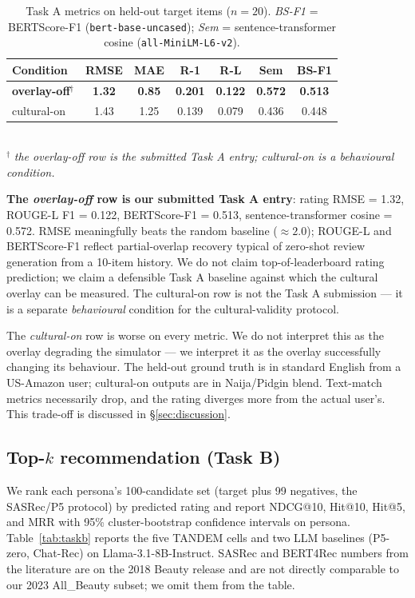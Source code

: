 \documentclass[8pt,twocolumn,a4paper]{extarticle}
\begin{document}
\begin{table}[h]
\centering
\footnotesize
\setlength{\tabcolsep}{4pt}
\caption{Task A metrics on held-out target items ($n=20$). \emph{BS-F1} = BERTScore-F1 (\texttt{bert-base-uncased}); \emph{Sem} = sentence-transformer cosine (\texttt{all-MiniLM-L6-v2}).}
\label{tab:taska}
\setlength{\tabcolsep}{3pt}
\begin{tabular}{lcccccc}
\toprule
Condition           & RMSE  & MAE   & R-1   & R-L   & Sem   & BS-F1 \\
\midrule
\textbf{overlay-off}$^\dagger$ & \textbf{1.32}  & \textbf{0.85}  & \textbf{0.201} & \textbf{0.122} & \textbf{0.572} & \textbf{0.513} \\
cultural-on                    & 1.43  & 1.25  & 0.139 & 0.079 & 0.436 & 0.448 \\
\bottomrule
\end{tabular}\\
{\scriptsize $^\dagger$ \emph{the overlay-off row is the submitted Task A entry; cultural-on is a behavioural condition.}}
\end{table}

\textbf{The \emph{overlay-off} row is our submitted Task A entry}: rating RMSE = 1.32, ROUGE-L F1 = 0.122, BERTScore-F1 = 0.513, sentence-transformer cosine = 0.572. RMSE meaningfully beats the random baseline ($\approx 2.0$); ROUGE-L and BERTScore-F1 reflect partial-overlap recovery typical of zero-shot review generation from a 10-item history. We do not claim top-of-leaderboard rating prediction; we claim a defensible Task A baseline against which the cultural overlay can be measured. The cultural-on row is not the Task A submission --- it is a separate \emph{behavioural} condition for the cultural-validity protocol.

The \emph{cultural-on} row is worse on every metric. We do not interpret this as the overlay degrading the simulator --- we interpret it as the overlay successfully changing its behaviour. The held-out ground truth is in standard English from a US-Amazon user; cultural-on outputs are in Naija/Pidgin blend. Text-match metrics necessarily drop, and the rating diverges more from the actual user's. This trade-off is discussed in \S\ref{sec:discussion}.

\subsection{Top-$k$ recommendation (Task B)}
\label{sec:results:taskb}

We rank each persona's 100-candidate set (target plus 99 negatives, the SASRec/P5 protocol) by predicted rating and report NDCG@10, Hit@10, Hit@5, and MRR with 95\% cluster-bootstrap confidence intervals on persona. Table~\ref{tab:taskb} reports the five TANDEM cells and two LLM baselines (P5-zero, Chat-Rec) on Llama-3.1-8B-Instruct. SASRec and BERT4Rec numbers from the literature are on the 2018 Beauty release and are not directly comparable to our 2023 All\_Beauty subset; we omit them from the table.
\end{document}
